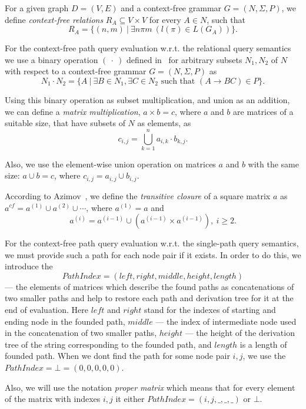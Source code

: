 For a given graph \mbox{$D = (V, E)$} and a context-free grammar $G = (N, \Sigma, P)$, we define \emph{context-free relations} \mbox{$R_A \subseteq V \times V$} for every \mbox{$A \in N$}, such that $$R_A = \{(n,m)~|~\exists n \pi m~(l(\pi) \in L(G_A))\}.$$

For the context-free path query evaluation w.r.t. the relational query semantics we use a binary operation $(~\cdot~)$ defined in~\cite{Azimov:2018:CPQ:3210259.3210264} for arbitrary subsets \mbox{$N_1, N_2$} of $N$ with respect to a context-free grammar \mbox{$G = (N, \Sigma, P)$} as $$N_1 \cdot N_2 = \{A~|~\exists B \in N_1, \exists C \in N_2 \text{ such that }(A \rightarrow B C) \in P\}.$$

Using this binary operation as subset multiplication, and union as an addition, we can define a \emph{matrix multiplication}, \mbox{$a \times b = c$}, where $a$ and $b$ are matrices of a suitable size, that have subsets of $N$ as elements, as $$c_{i,j} = \bigcup^{n}_{k=1}{a_{i,k} \cdot b_{k,j}}.$$

Also, we use the element-wise union operation on matrices $a$ and $b$ with the same size: \mbox{$a \cup b = c$}, where $c_{i,j} = a_{i,j} \cup b_{i,j}.$

According to Azimov~\cite{Azimov:2018:CPQ:3210259.3210264}, we define the \emph{transitive closure} of a square matrix $a$ as \mbox{$a^{cf} = a^{(1)} \cup a^{(2)} \cup \cdots$}, where \mbox{$a^{(1)} = a$} and $$a^{(i)} = a^{(i-1)} \cup (a^{(i-1)} \times a^{(i-1)}), ~i \ge 2.$$

For the context-free path query evaluation w.r.t. the single-path query semantics, we must provide such a path for each node pair if it exists. In order to do this, we introduce the $$PathIndex = (left,right,middle,height,length)$$ --- the elements of matrices which describe the found paths as concatenations of two smaller paths and help to restore each path and derivation tree for it at the end of evaluation. Here $left$ and $right$ stand for the indexes of starting and ending node in the founded path, $middle$ --- the index of intermediate node used in the concatenation of two smaller paths, $height$ --- the height of the derivation tree of the string corresponding to the founded path, and $length$ is a length of founded path. When we dont find the path for some node pair $i,j$, we use the $PathIndex = \bot = (0,0,0,0,0)$.

Also, we will use the notation \textit{proper matrix} which means that for every element of the matrix with indexes $i,j$ it either $PathIndex = (i,j,\_,\_,\_)$ or $\bot$.

